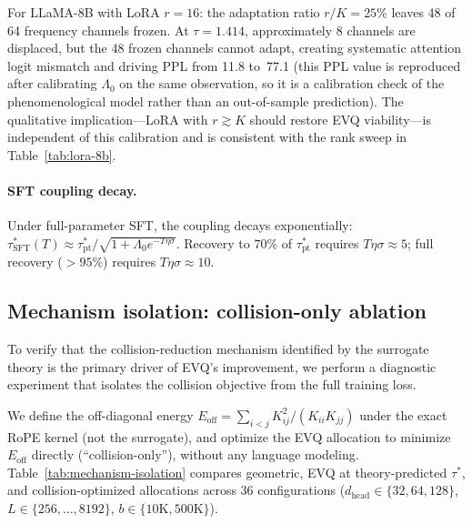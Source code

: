 For LLaMA-8B with LoRA $r{=}16$: the adaptation ratio $r/K = 25\%$ leaves 48 of 64 frequency channels frozen. At $\tau{=}1.414$, approximately 8 channels are displaced, but the 48 frozen channels cannot adapt, creating systematic attention logit mismatch and driving PPL from 11.8 to~77.1 (this PPL value is reproduced after calibrating $\Lambda_0$ on the same observation, so it is a calibration check of the phenomenological model rather than an out-of-sample prediction). The qualitative implication---LoRA with $r \gtrsim K$ should restore EVQ viability---is independent of this calibration and is consistent with the rank sweep in Table~\ref{tab:lora-8b}.

\paragraph{SFT coupling decay.} Under full-parameter SFT, the coupling decays exponentially: $\tau^*_{\mathrm{SFT}}(T) \approx \tau^*_{\mathrm{pt}} / \sqrt{1 + \Lambda_0 e^{-T\eta\sigma}}$. Recovery to $70\%$ of $\tau^*_{\mathrm{pt}}$ requires $T\eta\sigma \approx 5$; full recovery ($>95\%$) requires $T\eta\sigma \approx 10$.

\subsection{Mechanism isolation: collision-only ablation}
\label{sec:mechanism-isolation}

To verify that the collision-reduction mechanism identified by the surrogate theory is the primary driver of EVQ's improvement, we perform a diagnostic experiment that isolates the collision objective from the full training loss.

We define the off-diagonal energy $E_{\mathrm{off}} = \sum_{i<j} K_{ij}^2 / (K_{ii}K_{jj})$ under the exact RoPE kernel (not the surrogate), and optimize the EVQ allocation to minimize $E_{\mathrm{off}}$ directly (``collision-only''), without any language modeling. Table~\ref{tab:mechanism-isolation} compares geometric, EVQ at theory-predicted $\tau^*$, and collision-optimized allocations across 36 configurations ($d_{\mathrm{head}} \in \{32, 64, 128\}$, $L \in \{256,\ldots,8192\}$, $b \in \{10\mathrm{K}, 500\mathrm{K}\}$).

